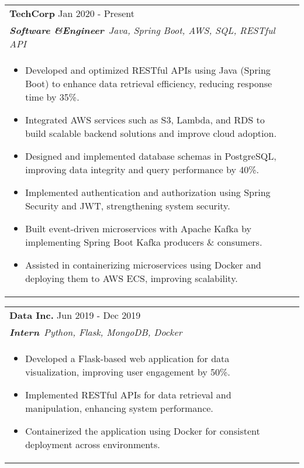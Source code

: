 \documentclass[a4paper,3pt]{article}
\begin{document}
\begin{tabularx}{\linewidth}{ @{}l r@{} }
\textbf{{TechCorp}} \hfill  Jan 2020 - Present \\[2pt]
\textbf{\textit{Software \&Engineer}}\ \hfill  \textit{Java, Spring Boot, AWS, SQL, RESTful API} \\[2pt]
\begin{minipage}[t]{\linewidth}
    \begin{itemize}[nosep,after=\strut, leftmargin=2em, itemsep=2pt]
        \item Developed and optimized RESTful APIs using Java (Spring Boot) to enhance data retrieval efficiency, reducing response time by 35\%.
\item Integrated AWS services such as S3, Lambda, and RDS to build scalable backend solutions and improve cloud adoption.
\item Designed and implemented database schemas in PostgreSQL, improving data integrity and query performance by 40\%.
\item Implemented authentication and authorization using Spring Security and JWT, strengthening system security.
\item Built event-driven microservices with Apache Kafka by implementing Spring Boot Kafka producers \& consumers.
\item Assisted in containerizing microservices using Docker and deploying them to AWS ECS, improving scalability.
    \end{itemize}
\end{minipage}
\end{tabularx}
\begin{tabularx}{\linewidth}{ @{}l r@{} }
\textbf{{Data Inc.}} \hfill  Jun 2019 - Dec 2019 \\[2pt]
\textbf{\textit{Intern}}\ \hfill  \textit{Python, Flask, MongoDB, Docker} \\[2pt]
\begin{minipage}[t]{\linewidth}
    \begin{itemize}[nosep,after=\strut, leftmargin=2em, itemsep=2pt]
        \item Developed a Flask-based web application for data visualization, improving user engagement by 50\%.
\item Implemented RESTful APIs for data retrieval and manipulation, enhancing system performance.
\item Containerized the application using Docker for consistent deployment across environments.
    \end{itemize}
\end{minipage}
\end{tabularx}
\end{document}
